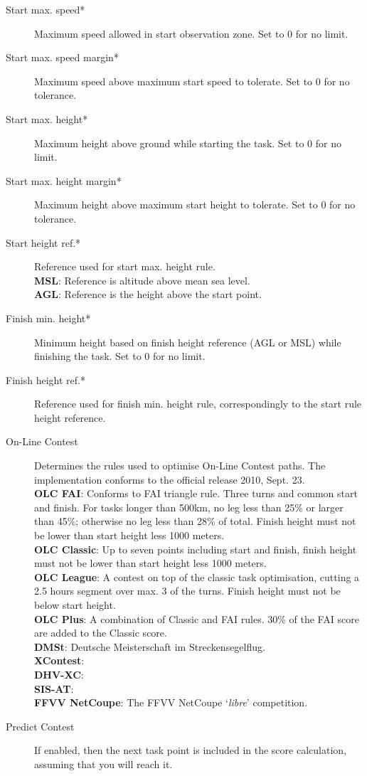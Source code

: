 \begin{description}
\item[Start max. speed*]  Maximum speed allowed in start observation zone.  Set 
  to 0 for no limit.
\item[Start max. speed margin*] Maximum speed above maximum start speed to tolerate. 
  Set to 0 for no tolerance.
\item[Start max. height*]  Maximum height above ground while starting the task. 
  Set to 0 for no limit.
\item[Start max. height margin*]  Maximum height above maximum start height to 
  tolerate.  Set to 0 for no tolerance.
\item[Start height ref.*]  Reference used for start max. height rule. \\
  {\bf MSL}: Reference is altitude above mean sea level. \\
  {\bf AGL}: Reference is the height above the start point.
\item[Finish min. height*]  Minimum height based on finish height reference 
  (AGL or MSL) while finishing the task.  Set to 0 for no limit.
\item[Finish height ref.*]  Reference used for finish min. height rule, 
  correspondingly to the start rule height reference.
\item[On-Line Contest]  Determines the rules used to optimise On-Line Contest 
  paths.  The implementation  conforms to the official release 2010, Sept. 23. \\
  {\bf OLC FAI}: Conforms to FAI triangle rule. Three turns and common start and 
  finish.  For tasks longer than
  500km, no leg less than 25\% or larger than 45\%; otherwise no leg less than 28\% 
  of total.  Finish height must not be lower than start height less 1000 meters. \\
  {\bf OLC Classic}: Up to seven points including start and finish, finish height
  must not be lower than start height less 1000 meters. \\
  {\bf OLC League}: A contest on top of the classic task optimisation, cutting
  a 2.5 hours segment over max. 3 of the turns. Finish height must not be below
  start height. \\
  {\bf OLC Plus}: A combination of Classic and FAI rules. 30\% of the FAI score
  are added to the Classic score. \\
  {\bf DMSt}: Deutsche Meisterschaft im Streckensegelflug. \\
  {\bf XContest}:  \\
  {\bf DHV-XC}:  \\
  {\bf SIS-AT}:  \\
  {\bf FFVV NetCoupe}: The FFVV NetCoupe `{\it libre}' competition.
\item[Predict Contest]  If enabled, then the next task point is included in the 
  score calculation, assuming that you will reach it.
\end{description}


